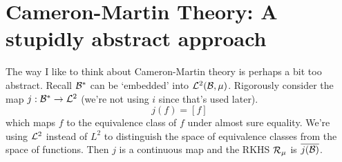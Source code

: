 \chapter{Cameron-Martin Theory: A stupidly abstract approach}

The way I like to think about Cameron-Martin theory is perhaps a bit too abstract. Recall $\mathcal B^*$ can be `embedded' into $\mathcal L^2(\mathcal B, \mu)$. Rigorously consider the map $j: \mathcal B^* \to \mathcal L^2$ (we're not using $i$ since that's used later).
\begin{equation}
	j(f) = [f]
\end{equation}
which maps $f$ to the equivalence class of $f$ under almost sure equality. We're using $\mathcal L^2$ instead of $L^2$ to distinguish the space of equivalence classes from the space of functions. Then $j$ is a continuous map and the RKHS $\mathcal R_{\mu}$ is $\overline{j(\mathcal B)}$. 

